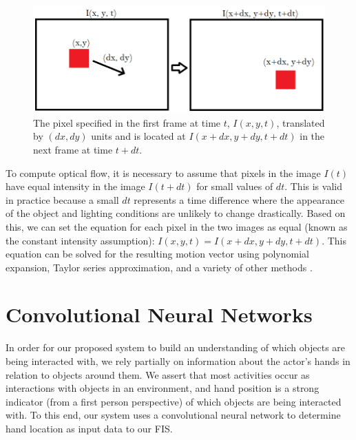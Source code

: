 \documentclass[12pt]{report}
\begin{document}
\begin{figure}
    \centering
    \includegraphics[width=\linewidth]{figure/optical_flow.png}
    \caption{The pixel specified in the first frame at time $t$, $I(x, y, t)$, translated by $(dx, dy)$ units and is located at $I(x+dx, y+dy, t+dt)$ in the next frame at time $t+dt$.}
    \label{fig:optical_flow}
\end{figure}

To compute optical flow, it is necessary to assume that pixels in the image $I(t)$ have equal intensity in the image $I(t+dt)$ for small values of $dt$. This is valid in practice because a small $dt$ represents a time difference where the appearance of the object and lighting conditions are unlikely to change drastically. Based on this, we can set the equation for each pixel in the two images as equal (known as the constant intensity assumption): $I(x, y, t)  = I(x+dx, y+dy, t+dt)$. This equation can be solved for the resulting motion vector using polynomial expansion, Taylor series approximation, and a variety of other methods \cite{Farneback2003Two-FrameOn, Horn1980DeterminingFlow, Lucas1981AnVision}.






\section{Convolutional Neural Networks}
In order for our proposed system to build an understanding of which objects are being interacted with, we rely partially on information about the actor's hands in relation to objects around them. We assert that most activities occur as interactions with objects in an environment, and hand position is a strong indicator (from a first person perspective) of which objects are being interacted with. To this end, our system uses a convolutional neural network to determine hand location as input data to our FIS.
\end{document}
